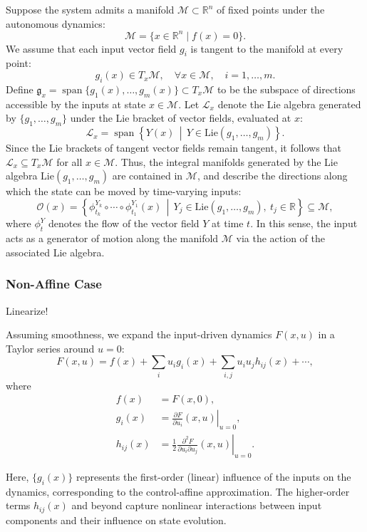 \documentclass{article}
\theoremstyle{definition} \newtheorem{definition}{Definition}  \newtheorem{example}{Example}
\theoremstyle{remark} \newtheorem{remark}{Remark}
\newcounter{ct}
\begin{document}
Suppose the system admits a manifold \( \mathcal{M} \subset \mathbb{R}^n \) of fixed points under the autonomous dynamics:
\[
\mathcal{M} = \{ x \in \mathbb{R}^n \mid f(x) = 0 \}.
\]
We assume that each input vector field \( g_i \) is tangent to the manifold at every point:
\[
g_i(x) \in T_x \mathcal{M}, \quad \forall x \in \mathcal{M}, \quad i = 1, \dots, m.
\]
Define \( \mathfrak{g}_x = \operatorname{span} \{ g_1(x), \dots, g_m(x) \} \subset T_x \mathcal{M} \) to be the subspace of directions accessible by the inputs at state \( x \in \mathcal{M} \). Let \( \mathcal{L}_x \) denote the Lie algebra generated by \( \{g_1, \dots, g_m\} \) under the Lie bracket of vector fields, evaluated at \( x \):
\[
\mathcal{L}_x = \operatorname{span} \left\{ Y(x) \,\middle|\, Y \in \mathrm{Lie}(g_1, \dots, g_m) \right\}.
\]
Since the Lie brackets of tangent vector fields remain tangent, it follows that \( \mathcal{L}_x \subseteq T_x \mathcal{M} \) for all \( x \in \mathcal{M} \).
Thus, the integral manifolds generated by the Lie algebra \( \mathrm{Lie}(g_1, \dots, g_m) \) are contained in \( \mathcal{M} \), and describe the directions along which the state can be moved by time-varying inputs:
\[
\mathcal{O}(x) = \left\{ \phi_{t_k}^{Y_k} \circ \cdots \circ \phi_{t_1}^{Y_1}(x) \,\middle|\, Y_j \in \mathrm{Lie}(g_1, \dots, g_m),\ t_j \in \mathbb{R} \right\} \subseteq \mathcal{M},
\]
where \( \phi_t^Y \) denotes the flow of the vector field \( Y \) at time \( t \). In this sense, the input acts as a generator of motion along the manifold \( \mathcal{M} \) via the action of the associated Lie algebra.


\subsubsection{Non-Affine Case}\label{sec:controlaffine}
Linearize!

Assuming smoothness, we expand the input-driven dynamics \( F(x, u) \) in a Taylor series around \( u = 0 \):
\[
F(x, u) = f(x) + \sum_{i} u_i g_i(x) + \sum_{i,j} u_i u_j h_{ij}(x) + \cdots,
\]
where
\begin{align}
f(x) &= F(x, 0),\\
g_i(x) &= \left. \frac{\partial F}{\partial u_i}(x, u) \right|_{u = 0},\\
h_{ij}(x) &= \left. \frac{1}{2} \frac{\partial^2 F}{\partial u_i \partial u_j}(x, u) \right|_{u = 0}.
\end{align}

Here, \( \{g_i(x)\} \) represents the first-order (linear) influence of the inputs on the dynamics, corresponding to the control-affine approximation. The higher-order terms \( h_{ij}(x) \) and beyond capture nonlinear interactions between input components and their influence on state evolution.
\end{document}
